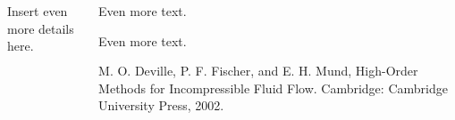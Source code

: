 \documentclass[final,t]{beamer}
\begin{document}
\begin{frame}[fragile]{}
\begin{columns}[t]
\begin{column}{.45\linewidth}
\begin{tcolorbox}[toplevelbox,adjusted title=Approach]
      \end{tcolorbox}

      \begin{tcolorbox}[toplevelbox,adjusted title= Test Cases]
        Insert even more details here.
      \end{tcolorbox}

    \end{column}



    \begin{column}{.45\linewidth}
      \begin{tcolorbox}[toplevelbox,adjusted title=Tech Detail 2]
        Even more text.
      \end{tcolorbox}

      \begin{tcolorbox}[toplevelbox,adjusted title=Results]
        Even more text.
      \end{tcolorbox}

      \begin{tcolorbox}[toplevelbox,adjusted title=References]
      [1] M. O. Deville, P. F. Fischer, and E. H. Mund, High-Order Methods for Incompressible Fluid Flow. Cambridge: Cambridge University Press, 2002.
      \end{tcolorbox}

    \end{column}


  \end{columns}
\end{frame}
\end{document}
